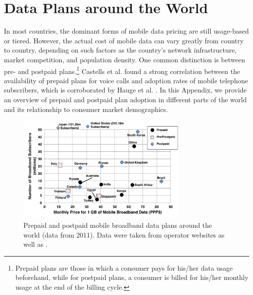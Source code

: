 \appendix

\section{Data Plans around the World}\label{Dataplans}

In most countries, the dominant forms of mobile data pricing are still usage-based or tiered. However, the actual cost of mobile data can vary greatly from country to country, depending on such factors as the country's network infrastructure, market competition, and population density. One common distinction is between pre- and postpaid plans.\footnote{Prepaid plans are those in which a consumer pays for his/her data usage beforehand, while for postpaid plans, a consumer is billed for his/her monthly usage at the end of the billing cycle.} Castells et al. \cite{castells2007mobile} found a strong correlation between the availability of prepaid plans for voice calls and adoption rates of mobile telephone subscribers, which is corroborated by Hauge et al. \cite{hauge2009whose}.  In this Appendix, we provide an overview of prepaid and postpaid plan adoption in different parts of the world and its relationship to consumer market demographics.

\begin{figure}
\centering
\includegraphics[width=0.75\textwidth]{Figures/World.pdf}
\caption{Prepaid and postpaid mobile broadband data plans around the world (data from 2011).  Data were taken from operator websites as well as \cite{chinamobile,SAfrica,cia,kenyatotal,egypttotal,singapore,itu,italy,india,docomo,oecd,chinatotal,russiatotal,braziltotal,korea,vietnamtotal,worldbank}.}
\label{fig:world}
\end{figure}

